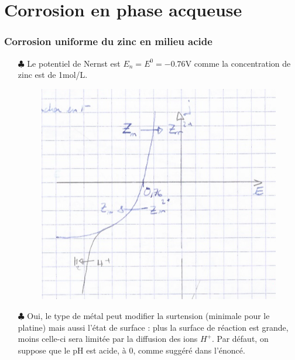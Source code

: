 \documentclass{report}
\begin{document}
\section*{Corrosion en phase acqueuse}

\subsubsection*{Corrosion uniforme du zinc en milieu acide}

\begin{itemize}
	
	\item[$\clubsuit$] Le potentiel de Nernst est $E_n=E^0=-0.76$V comme la concentration de zinc est de 1mol/L.
	
	\begin{figure}[h!]
	\centering
			\includegraphics[scale=0.25]{pot_zn.png}
	\end{figure}	
	
	\item[$\clubsuit$] Oui, le type de métal peut modifier la surtension (minimale pour le platine) mais aussi l'état de surface : plus la surface de réaction est grande, moins celle-ci sera limitée par la diffusion des ions $H^+$. Par défaut, on suppose que le pH est acide, à 0, comme suggéré dans l'énoncé. 
	

\end{itemize}
\end{document}
